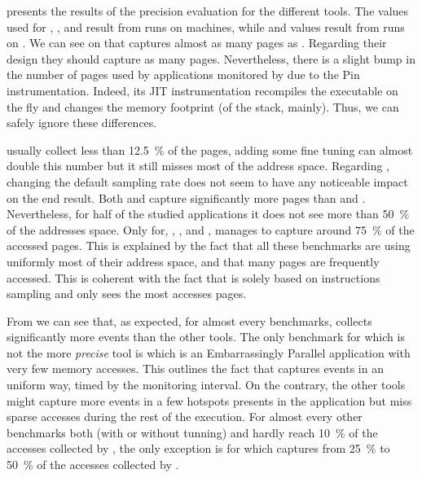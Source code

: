  presents the results of the precision evaluation for the
different tools. The values used for \Mitos, \MitosTun, \Moca and
\TABARNAC result from runs on \Edel machines, while \MemProf and \MemProfTun values result from runs on
\Stremi.
We can see on  that \Moca captures almost as many pages as \TABARNAC.
Regarding their design they should capture as many pages. Nevertheless, there is a slight
bump in the number of pages used by applications monitored by \TABARNAC due to the Pin instrumentation.
Indeed, its JIT instrumentation recompiles the executable on the fly and changes the memory footprint
(of the stack, mainly). Thus, we can safely ignore these differences.

\Mitos usually collect less than \SI{12.5}{\%} of the pages, adding some fine tuning
can almost double this number but it still misses most of the address space.
Regarding \MemProf, changing the default sampling rate does not seem to
have any noticeable impact on the end result. Both \MemProf and \MemProfTun capture significantly more pages than
\Mitos and \MitosTun. Nevertheless, for half of the studied applications it does
not see more than \SI{50}{\%} of the addresses space. Only for, \BT, \LU, \SP and \UA,
\MemProf manages to capture around \SI{75}{\%} of the accessed pages. This is explained by the fact that all these
benchmarks are using uniformly most of their address space, and that many pages are frequently accessed.
This is coherent with the fact that \MemProf is solely based on instructions sampling and only sees the most accesses pages.

From  we can see that, as expected, for almost every benchmarks,
\Moca collects significantly more events than the other tools.  The only
benchmark for which \Moca is not the more \emph{precise} tool is \EP which is an
Embarrassingly Parallel application with very few memory accesses.
This outlines the fact that \Moca captures events in an uniform way, timed by the monitoring interval.
On the contrary, the other tools might capture more events in a few hotspots presents in the application but miss
sparse accesses during the rest of the execution.
For almost
every other benchmarks both \Mitos (with or without tunning) and \MemProf
hardly reach \SI{10}{\%} of the accesses collected by \Moca, the only exception is
\DC for which \MemProf captures from \SI{25}{\%} to \SI{50}{\%} of the accesses
collected by \Moca.

